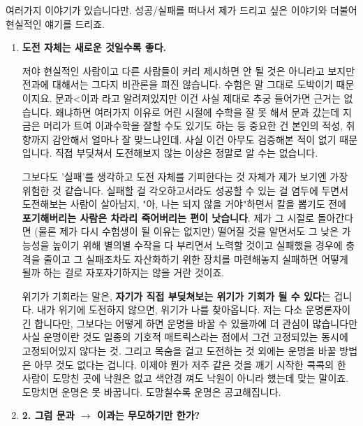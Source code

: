 여러가지 이야기가 있습니다만.
성공/실패를 떠나서 제가 드리고 싶은 이야기와 더불어 현실적인 얘기를 드리죠.
\vspace{5mm}
\begin{enumerate}

\item \textbf{도전 자체는 새로운 것일수록 좋다.}
\vspace{5mm}

저야 현실적인 사람이고 다른 사람들이 커리 제시하면 안 될 것은 아니라고 보지만
전과에 대해서는 그다지 비관론을 펴진 않습니다. 수험은 말 그대로 도박이기 때문이지요.
문과<이과 라고 알려져있지만 이건 사실 제대로 추궁 들어가면 근거는 없습니다.
왜냐하면 여러가지 이유로 어린 시절에 수학을 잘 못 해서 문과 갔는데 지금은 머리가 트여 이과수학을 잘할 수도 있기도 하는 등
중요한 건 본인의 적성, 취향까지 감안해서 얼마나 잘 맞느냐인데.
사실 이건 아무도 검증해본 적이 없기 때문입니다. 직접 부딪쳐서 도전해보지 않는 이상은 정말로 알 수는 없습니다.
\vspace{5mm}

그보다도 '실패'를 생각하고 도전 자체를 기피한다는 것 자체가 제가 보기엔 가장 위험한 것 같습니다.
실패할 걸 각오하고서라도 성공할 수 있는 걸 염두에 두면서 도전해보는 사람이 살아남지,
"아, 나는 되지 않을 거야"하면서 칼을 뽑기도 전에 \textbf{포기해버리는 사람은 차라리 죽어버리는 편이 낫습니다}.
제가 그 시절로 돌아간다면 (물론 제가 다시 수험생이 될 이유는 없지만)
떨어질 것을 알면서도 그 낮은 가능성을 높이기 위해 별의별 수작을 다 부리면서 노력할 것이고
실패했을 경우에 충격을 줄이고 그 실패조차도 자산화하기 위한 장치를 마련해놓지
실패하면 어떻게 될까 하는 걸로 자포자기하지는 않을 거란 것이죠.
\vspace{5mm}

위기가 기회라는 말은, \textbf{자기가 직접 부딪쳐보는 위기가 기회가 될 수 있다}는 겁니다.
내가 위기에 도전하지 않으면, 위기가 나를 찾아옵니다.
저는 다소 운명론자이긴 합니다만, 그보다는 어떻게 하면 운명을 바꿀 수 있을까에 더 관심이 많습니다만
사실 운명이란 것도 일종의 기호적 매트릭스라는 점에서 그건 고정되있는 동시에 고정되어있지 않다는 것.
그리고 목숨을 걸고 도전하는 것 외에는 운명을 바꿀 방법은 아무 것도 없다는 겁니다.
이제야 뭔가 저주 같은 것을 깨기 시작한 콕콕의 한 사람이 도망친 곳에 낙원은 없고 색안경 껴도 낙원이 아니라 했는데 맞는 말이죠.
도망치면 운명은 못 바꿉니다. 도망칠수록 운명은 공고해집니다.
\vspace{5mm}

\item \textbf{2. 그럼 문과 $\rightarrow$ 이과는 무모하기만 한가?}
\vspace{5mm}



\end{enumerate}
